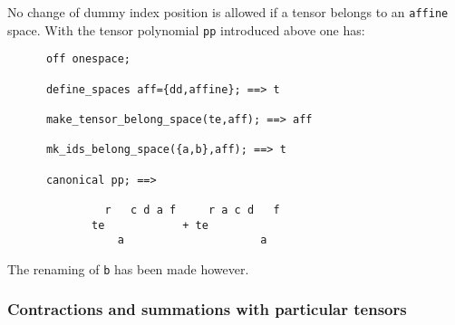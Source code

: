 No change of dummy index position is allowed if a tensor belongs
to an  \texttt{affine}%
space.
With the tensor polynomial \texttt{pp} introduced above one has:
\begin{verbatim}
      off onespace;

      define_spaces aff={dd,affine}; ==> t

      make_tensor_belong_space(te,aff); ==> aff

      mk_ids_belong_space({a,b},aff); ==> t

      canonical pp; ==>

               r   c d a f     r a c d   f
             te            + te
                 a                     a
\end{verbatim}
The renaming of \texttt{b} has been made however.

\subsubsection{Contractions and summations with particular tensors}

